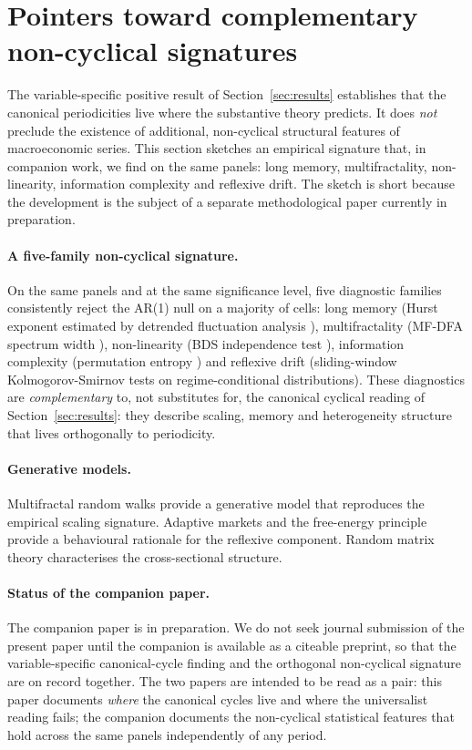 \section{Pointers toward complementary non-cyclical signatures}
\label{sec:pointers}

The variable-specific positive result of
Section~\ref{sec:results} establishes that the canonical
periodicities live where the substantive theory predicts. It
does \emph{not} preclude the existence of additional,
non-cyclical structural features of macroeconomic series. This
section sketches an empirical signature that, in companion
work, we find on the same panels: long memory, multifractality,
non-linearity, information complexity and reflexive drift. The
sketch is short because the development is the subject of a
separate methodological paper currently in preparation.

\paragraph{A five-family non-cyclical signature.}
On the same panels and at the same significance level, five
diagnostic families consistently reject the AR(1) null on a
majority of cells: long memory (Hurst exponent estimated by
detrended fluctuation analysis \citep{peng1994,hurst1951}),
multifractality (MF-DFA spectrum width
\citep{kantelhardt2002,bacry_muzy_delour2001}), non-linearity
(BDS independence test
\citep{brock_dechert_scheinkman1996}), information complexity
(permutation entropy \citep{bandt_pompe2002}) and reflexive
drift (sliding-window Kolmogorov-Smirnov tests on
regime-conditional distributions). These diagnostics are
\emph{complementary} to, not substitutes for, the canonical
cyclical reading of
Section~\ref{sec:results}: they describe scaling, memory and
heterogeneity structure that lives orthogonally to
periodicity.

\paragraph{Generative models.}
Multifractal random walks \citep{bacry_muzy_delour2001,
calvet_fisher2002,calvet_fisher2008} provide a generative
model that reproduces the empirical scaling signature.
Adaptive markets \citep{lo2017} and the free-energy principle
\citep{friston2010} provide a behavioural rationale for the
reflexive component. Random matrix theory
\citep{marchenko_pastur1967,laloux1999,bouchaud_potters2003}
characterises the cross-sectional structure.

\paragraph{Status of the companion paper.}
The companion paper is in preparation. We do not seek journal
submission of the present paper until the companion is
available as a citeable preprint, so that the variable-specific
canonical-cycle finding and the orthogonal non-cyclical
signature are on record together. The two papers are intended
to be read as a pair: this paper documents \emph{where} the
canonical cycles live and where the universalist reading
fails; the companion documents the non-cyclical statistical
features that hold across the same panels independently of any
period.
